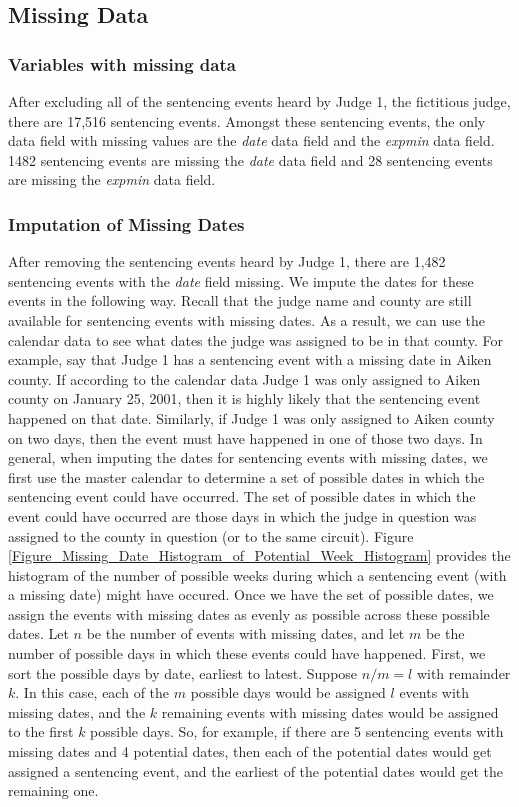 \documentclass[11pt, oneside]{article}   	%
\theoremstyle{ModifiedStyle}
\begin{document}
  \subsection{Missing Data}
    \subsubsection{Variables with missing data}
      After excluding all of the sentencing events heard by Judge 1, the fictitious judge, there are 17,516 sentencing events. Amongst these sentencing events, the only data field with missing values are the \emph{date} data field and the \emph{expmin} data field. 1482 sentencing events are missing the \emph{date} data field and 28 sentencing events are missing the \emph{expmin} data field.

		\subsubsection{Imputation of Missing Dates}
      After removing the sentencing events heard by Judge 1, there are 1,482 sentencing events with the \textit{date} field missing. We impute the dates for these events in the following way. Recall that the judge name and county are still available for sentencing events with missing dates. As a result, we can use the calendar data to see what dates the judge was assigned to be in that county. For example, say that Judge 1 has a sentencing event with a missing date in Aiken county. If according to the calendar data Judge 1 was only assigned to Aiken county on January 25, 2001, then it is highly likely that the sentencing event happened on that date. Similarly, if Judge 1 was only assigned to Aiken county on two days, then the event must have happened in one of those two days. In general, when imputing the dates for sentencing events with missing dates, we first use the master calendar to determine a set of possible dates in which the sentencing event could have occurred. The set of possible dates in which the event could have occurred are those days in which the judge in question was assigned to the county in question (or to the same circuit). Figure \ref{Figure_Missing_Date_Histogram_of_Potential_Week_Histogram} provides the histogram of the number of possible weeks during which a sentencing event (with a missing date) might have occured. Once we have the set of possible dates, we assign the events with missing dates as evenly as possible across these possible dates. Let $n$ be the number of events with missing dates, and let $m$ be the number of possible days in which these events could have happened. First, we sort the possible days by date, earliest to latest. Suppose $n/m = l$ with remainder $k$. In this case, each of the $m$ possible days would be assigned $l$ events with missing dates, and the $k$ remaining events with missing dates would be assigned to the first $k$ possible days.  So, for example, if there are 5 sentencing events with missing dates and 4 potential dates, then each of the potential dates would get assigned a sentencing event, and the earliest of the potential dates would get the remaining one.
\end{document}

